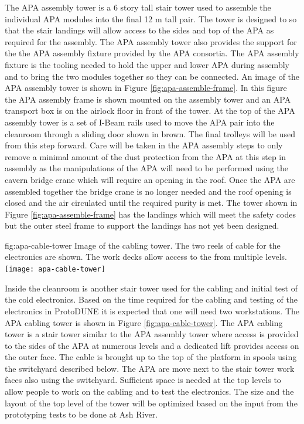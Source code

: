 The APA assembly tower is a 6 story tall stair tower used to assemble the individual APA modules into the final 12 \si{m} tall pair. 
The tower is designed to so that the stair landings will allow access to the sides and top of the APA as required for the assembly. 
The APA assembly tower also provides the support for the the APA assembly fixture provided by the APA consortia. 
The APA assembly fixture is the tooling needed to hold the upper and lower APA during assembly and to bring the two modules together so they can be connected. 
An image of the APA assembly tower is shown in Figure \ref{fig:apa-assemble-frame}. 
In this figure the APA assembly frame is shown mounted on the assembly tower and an APA transport box is on the airlock floor in front of the tower. 
At the top of the APA assembly tower is a set of I-Beam rails used to move the APA pair into the cleanroom through a sliding door shown in brown. 
The final trolleys will be used from this step forward. 
Care will be taken in the APA assembly steps to only remove a minimal amount of the dust protection from the APA at this step in assembly as the manipulations of the APA will need to be performed using the cavern bridge crane which will require an opening in the roof. 
Once the APA are assembled together the bridge crane is no longer needed and the roof opening is closed and the air circulated until the required purity is met. The tower shown in Figure \ref{fig:apa-assemble-frame} has the landings which will meet the safety codes but the outer steel frame to support the landings has not yet been designed.


\begin{dunefigure}{fig:apa-cable-tower}
  {Image of the  cabling tower. The two reels of cable for the electronics are shown. The work decks allow access to the  from multiple levels. }
\texttt{[image: apa-cable-tower]}
\end{dunefigure}

Inside the cleanroom is another stair tower used for the cabling and initial test of the cold electronics. Based on the time required for the cabling and testing of the electronics in ProtoDUNE it is expected that one will need two workstations. The APA cabling tower is shown in Figure \ref{fig:apa-cable-tower}. The APA cabling tower is a stair tower similar to the APA assembly tower where access is provided to the sides of the APA at numerous levels and a dedicated lift provides access on the outer face. The cable is brought up to the top of the platform in spools using the switchyard described below. The APA are move next to the stair tower work faces also using the switchyard.  Sufficient space is needed at the top levels to allow people to work on the cabling and to test the electronics. The size and the layout of the top level of the tower will be optimized based on the input from the prototyping tests to be done at Ash River. 

